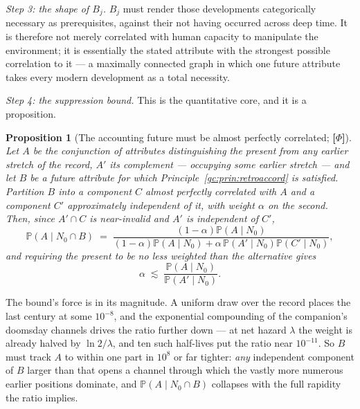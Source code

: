 \documentclass[11pt]{article}
\numberwithin{equation}{section}
\theoremstyle{plain}
\newtheorem{proposition}[theorem]{Proposition}
\theoremstyle{definition}
\theoremstyle{remark}
\newcommand{\PP}{\mathbb{P}}
\begin{document}
\emph{Step 3: the shape of $B_j$.} $B_j$ must render those developments
categorically necessary as prerequisites, against their not having
occurred across deep time. It is therefore not merely correlated with
human capacity to manipulate the environment; it is essentially the
stated attribute with the strongest possible correlation to it --- a
maximally connected graph in which one future attribute takes every
modern development as a total necessity.

\emph{Step 4: the suppression bound.} This is the quantitative core, and
it is a proposition.

\begin{proposition}[The accounting future must be almost perfectly
correlated; \textbf{[$\Phi$]}]\label{gc:prop:alpha}
Let $A$ be the conjunction of attributes distinguishing the present from
any earlier stretch of the record, $A'$ its complement --- occupying some
earlier stretch --- and let $B$ be a future attribute for which
Principle~\ref{gc:prin:retroaccord} is satisfied. Partition $B$ into a
component $C$ almost perfectly correlated with $A$ and a component $C'$
approximately independent of it, with weight $\alpha$ on the second.
Then, since $A'\cap C$ is near-invalid and $A'$ is independent of $C'$,
\begin{equation}\label{gc:eq:alpha}
\PP(A\mid N_0\cap B)\;=\;
\frac{(1-\alpha)\PP(A\mid N_0)}
{(1-\alpha)\PP(A\mid N_0)+\alpha\,\PP(A'\mid N_0)\PP(C'\mid N_0)},
\end{equation}
and requiring the present to be no less weighted than the alternative
gives
\begin{equation}\label{gc:eq:alphabound}
\alpha\;\lesssim\;\frac{\PP(A\mid N_0)}{\PP(A'\mid N_0)} .
\end{equation}
\end{proposition}

The bound's force is in its magnitude. A uniform draw over the record
places the last century at some $10^{-8}$, and the exponential
compounding of the companion's doomsday channels drives the ratio
further down --- at net hazard $\lambda$ the weight is already halved by
$\ln2/\lambda$, and ten such half-lives put the ratio near $10^{-11}$.
So $B$ must track $A$ to within one part in $10^{8}$ or far tighter:
\emph{any} independent component of $B$ larger than that opens a channel
through which the vastly more numerous earlier positions dominate, and
$\PP(A\mid N_0\cap B)$ collapses with the full rapidity the ratio
implies.
\end{document}
